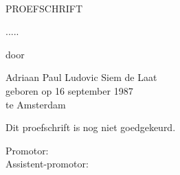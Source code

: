 \begin{center}

\vspace*{2cm}

\\[1em]


\begin{onehalfspace}

\vspace{2cm}

PROEFSCHRIFT

\vspace{2cm}

.....\\

\vspace{1cm}

door

\vspace{1cm}

Adriaan Paul Ludovic Siem de Laat\\
geboren op 16 september 1987\\
te Amsterdam

\end{onehalfspace}
\end{center}


\newpage


\noindent
Dit proefschrift is nog niet goedgekeurd.
\begin{tabbing}
Promotor: \\
Assistent-promotor: 
\end{tabbing}
